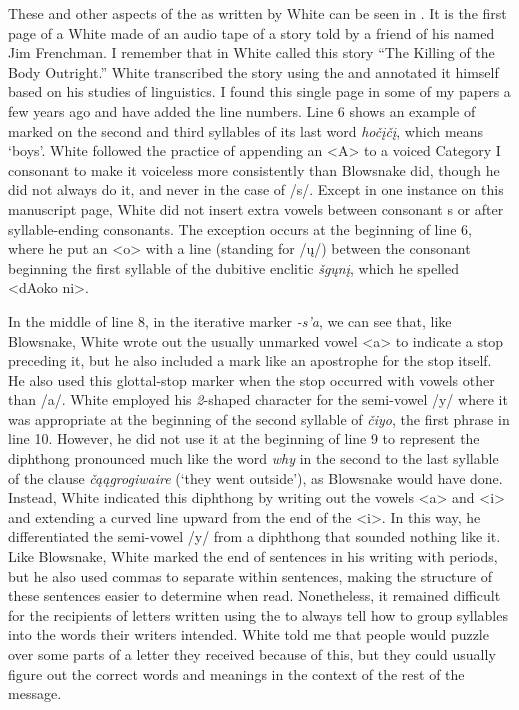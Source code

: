 \documentclass[output=paper]{LSP/langsci}
\begin{document}
These and other aspects of the  as written by White can be seen in . It is the first page of a  White made of an audio tape of a story told by a friend of his named Jim Frenchman. I remember that in  White called this story ``The Killing of the Body Outright.'' White transcribed the story using the  and annotated it himself based on his studies of linguistics. I found this single page in some of my papers a few years ago and have added the line numbers. Line 6 shows an example of  marked on the second and third syllables of its last word \emph{ho\v{c}\k{i}\v{c}\k{i}}, which means `boys'. White followed the practice of appending an <A> to a voiced Category I consonant to make it voiceless more consistently than Blowsnake did, though he did not always do it, and never in the case of /s/. Except in one instance on this manuscript page, White did not insert extra vowels between consonant s or after syllable-ending consonants. The exception occurs at the beginning of line 6, where he put an <o> with a  line (standing for /\k{u}/) between the consonant  beginning the first syllable of the dubitive enclitic \emph{\v{s}g\k{u}n\k{i}}, which he spelled <dAoko ni>. 

In the middle of line 8, in the iterative marker \emph{-s'a}, we can see that, like Blow\-snake, White wrote out the usually unmarked vowel <a> to indicate a  stop preceding it, but he also included a mark like an apostrophe for the stop itself. He also used this glottal-stop marker when the  stop occurred with vowels other than /a/. White employed his \emph{2}-shaped  character for the semi-vowel /y/ where it was appropriate at the beginning of the second syllable of \emph{\v{c}iyo}, the first phrase in line 10. However, he did not use it at the beginning of line 9 to represent the diphthong pronounced much like the  word \emph{why} in the second to the last syllable of the clause \emph{\v{c}\k{a}\k{a}grogiwaire} (`they went outside'), as Blowsnake would have done. Instead, White indicated this diphthong by writing out the vowels <a> and <i> and extending a curved line upward from the end of the <i>. In this way, he differentiated the semi-vowel /y/ from a diphthong that sounded nothing like it. Like Blowsnake, White marked the end of sentences in his  writing with periods, but he also used commas to separate  within sentences, making the structure of these sentences easier to determine when read. Nonetheless, it remained difficult for the recipients of letters written using the  to always tell how to group syllables into the words their writers intended. White told me that people would puzzle over some parts of a letter they received because of this, but they could usually figure out the correct words and meanings in the context of the rest of the message. 
\end{document}
